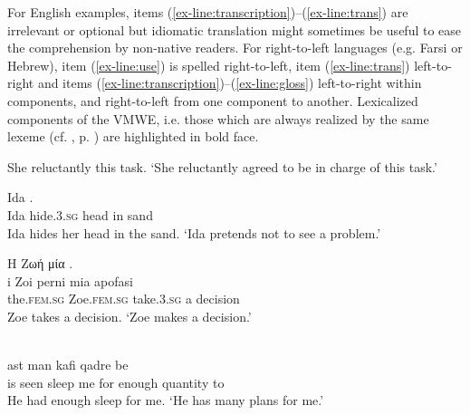 \documentclass[output=paper,
modfonts,
]{langscibook}
\begin{document}
For English examples, items (\ref{ex-line:transcription})--(\ref{ex-line:trans}) are irrelevant or optional but idiomatic translation might sometimes be useful to ease the comprehension by non-native readers. For right-to-left languages (e.g. Farsi or Hebrew), item (\ref{ex-line:use}) is spelled right-to-left, item (\ref{ex-line:trans}) left-to-right and items (\ref{ex-line:transcription})--(\ref{ex-line:gloss}) left-to-right within components, and right-to-left from one component to another. 
Lexicalized components of the VMWE, i.e. those which are always realized by the same lexeme (cf.  , p. \pageref{sec:def-scope}) are highlighted in bold face. 



\ea\label{preface:en:take-on}
\settowidth {} 
She reluctantly   this task. 
\glt `She reluctantly agreed to be in charge of this task.'
\z

\ea \label{preface:sl:skrivati-glavo-v-pesek}
\settowidth {} 
\gll Ida    . \\
Ida hide.\textsc{3.sg} head in sand \\ 
\glt Ida hides her head in the sand. `Ida pretends not to see a problem.’
\z

\ea \label{preface:el:take-decision}
\settowidth {} 
\glll Η Ζωή  μία . \\
i Zoi perni mia apofasi \\
the\textsc{.fem.sg} Zoe\textsc{.fem.sg} take.\textsc{3.sg} a decision \\ 
\glt Zoe takes a decision. `Zoe makes a decision.'
\z

\ea \label{preface:fa:have-sleep-for-sb}
\settowidth {} 
\glll {}        \\
ast   man  kafi qadre be  \\
is seen sleep me for enough quantity to\\ 
\glt He had enough sleep for me. `He has many plans for me.’
\z

\end{document}
